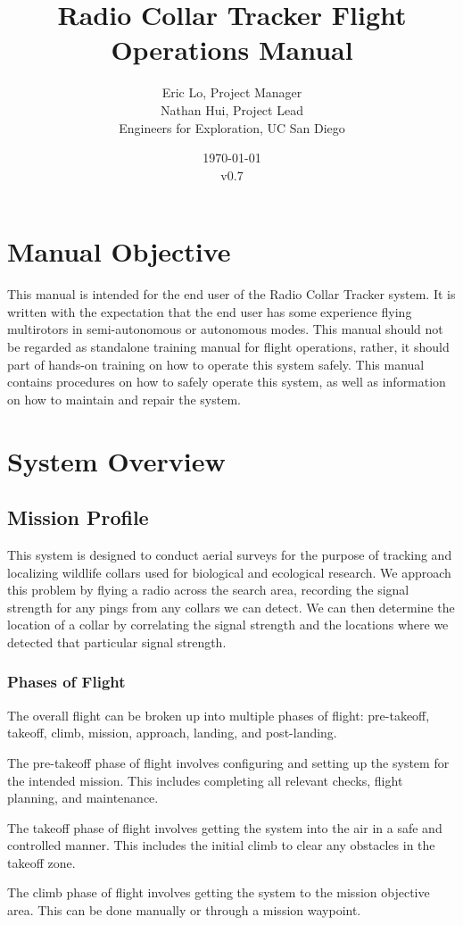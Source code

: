 \documentclass{report}
\title{Radio Collar Tracker Flight Operations Manual}
\author{Eric Lo, Project Manager\\Nathan Hui, Project Lead\\Engineers for Exploration, UC San Diego}
\date{\today\\v0.7}
\begin{document}
\maketitle
\tableofcontents
\chapter{Manual Objective}
	This manual is intended for the end user of the Radio Collar Tracker system.  It is written with the expectation that the end user has some experience flying \glspl{multirotor} in semi-autonomous or autonomous modes.  This manual should not be regarded as standalone training manual for flight operations, rather, it should part of hands-on training on how to operate this system safely.  This manual contains procedures on how to safely operate this system, as well as information on how to maintain and repair the system.
\chapter{System Overview}
	\section{Mission Profile}
		This system is designed to conduct aerial surveys for the purpose of tracking and localizing wildlife collars used for biological and ecological research.  We approach this problem by flying a radio across the search area, recording the signal strength for any pings from any collars we can detect.  We can then determine the location of a collar by correlating the signal strength and the locations where we detected that particular signal strength.

		\subsection{Phases of Flight}
			The overall flight can be broken up into multiple phases of flight: pre-takeoff, takeoff, climb, mission, approach, landing, and post-landing.

			The pre-takeoff phase of flight involves configuring and setting up the system for the intended mission.  This includes completing all relevant checks, flight planning, and maintenance.

			The takeoff phase of flight involves getting the system into the air in a safe and controlled manner.  This includes the initial climb to clear any obstacles in the takeoff zone.

			The climb phase of flight involves getting the system to the mission objective area.  This can be done manually or through a mission waypoint.
\end{document}
